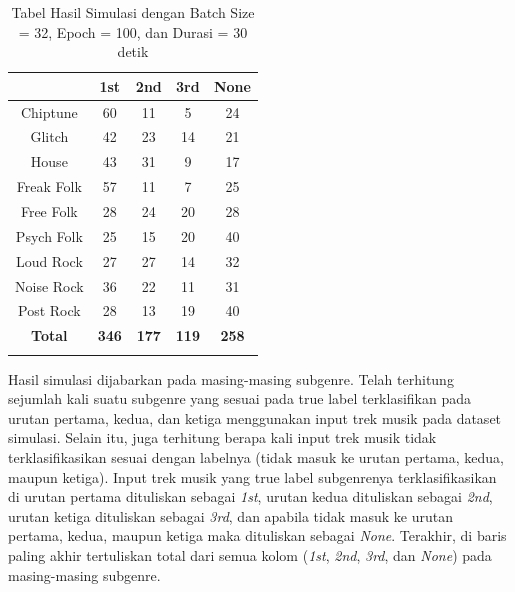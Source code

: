 \begin{longtable}[c]{|c|c|c|c|c|}
	\hline
	\textbf{}      & \textbf{1st} & \textbf{2nd} & \textbf{3rd} & \textbf{None} \\ \hline
	\endfirsthead
	\endhead
	Chiptune       & 60           & 11           & 5            & 24            \\ \hline
	Glitch         & 42           & 23           & 14           & 21            \\ \hline
	House          & 43           & 31           & 9            & 17            \\ \hline
	Freak Folk     & 57           & 11           & 7            & 25            \\ \hline
	Free Folk      & 28           & 24           & 20           & 28            \\ \hline
	Psych Folk     & 25           & 15           & 20           & 40            \\ \hline
	Loud Rock      & 27           & 27           & 14           & 32            \\ \hline
	Noise Rock     & 36           & 22           & 11           & 31            \\ \hline
	Post Rock      & 28           & 13           & 19           & 40            \\ \hline
	\textbf{Total} & \textbf{346} & \textbf{177} & \textbf{119} & \textbf{258}  \\ \hline
	\caption{Tabel Hasil Simulasi dengan Batch Size = 32, Epoch = 100, dan Durasi = 30 detik}
	\label{tab:my-table}\\
\end{longtable}

Hasil simulasi dijabarkan pada masing-masing subgenre. Telah terhitung sejumlah kali suatu subgenre yang sesuai pada true label terklasifikan pada urutan pertama, kedua, dan ketiga menggunakan input trek musik pada dataset simulasi. Selain itu, juga terhitung berapa kali input trek musik tidak terklasifikasikan sesuai dengan labelnya (tidak masuk ke urutan pertama, kedua, maupun ketiga).
Input trek musik yang true label subgenrenya terklasifikasikan di urutan pertama dituliskan sebagai \emph{1st}, urutan kedua dituliskan sebagai \emph{2nd}, urutan ketiga dituliskan sebagai \emph{3rd}, dan apabila tidak masuk ke urutan pertama, kedua, maupun ketiga maka dituliskan sebagai \emph{None}. Terakhir, di baris paling akhir tertuliskan total dari semua kolom (\emph{1st}, \emph{2nd}, \emph{3rd}, dan \emph{None}) pada masing-masing subgenre.

